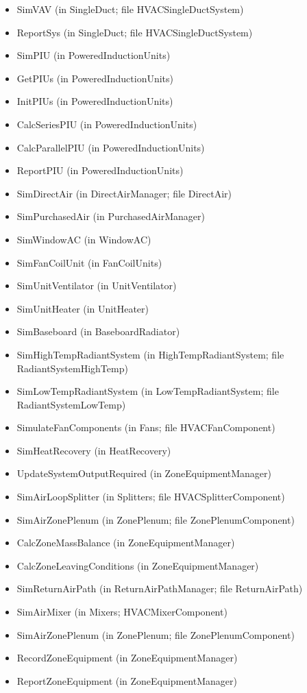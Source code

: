 \begin{itemize}
\item
  SimVAV (in SingleDuct; file HVACSingleDuctSystem)
\item
  ReportSys (in SingleDuct; file HVACSingleDuctSystem)
\item
  SimPIU (in PoweredInductionUnits)
\item
  GetPIUs (in PoweredInductionUnits)
\item
  InitPIUs (in PoweredInductionUnits)
\item
  CalcSeriesPIU (in PoweredInductionUnits)
\item
  CalcParallelPIU (in PoweredInductionUnits)
\item
  ReportPIU (in PoweredInductionUnits)
\item
  SimDirectAir (in DirectAirManager; file DirectAir)
\item
  SimPurchasedAir (in PurchasedAirManager)
\item
  SimWindowAC (in WindowAC)
\item
  SimFanCoilUnit (in FanCoilUnits)
\item
  SimUnitVentilator (in UnitVentilator)
\item
  SimUnitHeater (in UnitHeater)
\item
  SimBaseboard (in BaseboardRadiator)
\item
  SimHighTempRadiantSystem (in HighTempRadiantSystem; file RadiantSystemHighTemp)
\item
  SimLowTempRadiantSystem (in LowTempRadiantSystem; file RadiantSystemLowTemp)
\item
  SimulateFanComponents (in Fans; file HVACFanComponent)
\item
  SimHeatRecovery (in HeatRecovery)
\item
  UpdateSystemOutputRequired (in ZoneEquipmentManager)
\item
  SimAirLoopSplitter (in Splitters; file HVACSplitterComponent)
\item
  SimAirZonePlenum (in ZonePlenum; file ZonePlenumComponent)
\item
  CalcZoneMassBalance (in ZoneEquipmentManager)
\item
  CalcZoneLeavingConditions (in ZoneEquipmentManager)
\item
  SimReturnAirPath (in ReturnAirPathManager; file ReturnAirPath)
\item
  SimAirMixer (in Mixers; HVACMixerComponent)
\item
  SimAirZonePlenum (in ZonePlenum; file ZonePlenumComponent)
\item
  RecordZoneEquipment (in ZoneEquipmentManager)
\item
  ReportZoneEquipment (in ZoneEquipmentManager)
\end{itemize}
